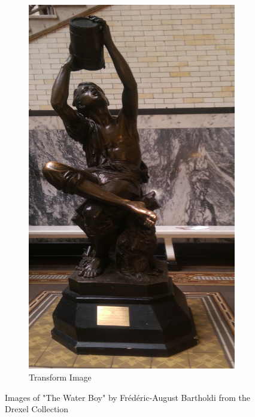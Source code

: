 \documentclass{article}
\begin{document}
\begin{figure}
\begin{subfigure}[b]{0.3\textwidth}
		\includegraphics[width=\textwidth]{figures/alignment/waterboy_right}
		\caption{Transform Image}
	\end{subfigure}
	\caption{Images of "The Water Boy" by Frédéric-August Bartholdi from the Drexel Collection}
	\label{fig_waterboy_left_right}
\end{figure}
\end{document}
